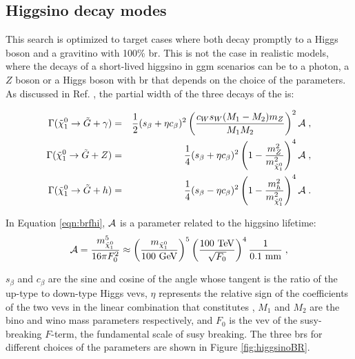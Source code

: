 \subsection{Higgsino decay modes}

This search is optimized to target cases where both \hino decay promptly to a Higgs boson and a gravitino with 100\% \gls{br}.
This is not the case in realistic models, where the decays of a short-lived higgsino in \gls{ggm} scenarios  
can be to a photon, a $Z$ boson or a Higgs boson with 
\gls{br} that depends on the choice of the parameters.
As discussed in Ref. \cite{Meade:2009qv}, the partial width of the three decays of the \ninoone is:

\begin{eqnarray}
\label{eqn:brfhi}
\Gamma(\tilde\chi_1^0\to \tilde G+\gamma)&=& {1\over2}(s_\beta+\eta c_\beta)^2\left({c_Ws_W(M_1-M_2)m_Z\over M_1 M_2}\right)^2 {\cal A} \;,
\nonumber\\
 \Gamma(\tilde\chi_1^0\to \tilde G+Z)&=&{1\over4}(s_\beta+\eta c_\beta)^2\left(1 - \frac{m_Z^2}{m^2_{\tilde{\chi}^0_1}}\right)^4 {\cal A} \;,\\
  \Gamma(\tilde\chi_1^0\to \tilde G+h)&=&{1\over4}(s_\beta-\eta c_\beta)^2\left(1 - \frac{m_h^2}{m^2_{\tilde{\chi}^0_1}}\right)^4 {\cal A} \;. \nonumber
\end{eqnarray}

\noindent In Equation \ref{eqn:brfhi}, ${\cal A}$ is a parameter related to the higgsino lifetime:
\begin{equation}
\label{eqn:decaylength}
{\cal A} = \frac{m^5_{\tilde{\chi}^0_1}}{16\pi F_0^2} \approx \left(\frac{m_{\tilde{\chi}^0_1}}{100~{\rm GeV}}\right)^5 \left(\frac{100~\rm{TeV}}{\sqrt{F_0}}\right)^4 \frac{1}{0.1~{\rm mm}} \;,
\end{equation}

\noindent $s_\beta$ and $c_\beta$ are the sine and cosine of the angle whose tangent is 
the ratio of the up-type to down-type Higgs \glspl{vev}, 
$\eta$ represents the relative sign of the coefficients 
of the two \glspl{vev} in the linear combination that constitutes \ninoone,
$M_1$ and $M_2$ are the bino and wino mass parameters respectively, and 
$F_0$ is the \gls{vev} of the \gls{susy}-breaking $F$-term, the fundamental scale of \gls{susy} breaking.
The three \glspl{br} for different choices of the parameters are shown in Figure \ref{fig:higgsinoBR}.

